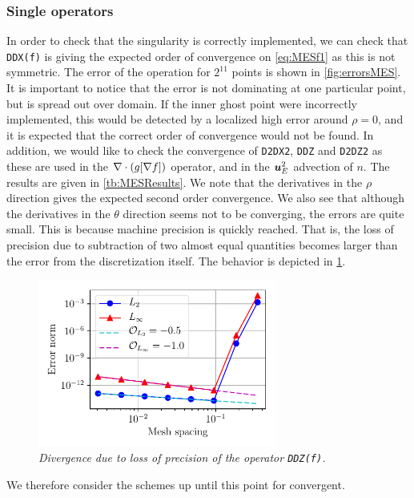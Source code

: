 \subsubsection{Single operators}
\label{sec:singleOp}
%
In order to check that the singularity is correctly implemented, we can check that \texttt{DDX(f)} is giving the expected order of convergence on \cref{eq:MESf1} as this is not symmetric.
The error of the operation for $2^{11}$ points is shown in \cref{fig:errorsMES}.
It is important to notice that the error is not dominating at one particular point, but is spread out over domain.
If the inner ghost point were incorrectly implemented, this would be detected by a localized high error around $\rho=0$, and it is expected that the correct order of convergence would not be found.
In addition, we would like to check the convergence of \texttt{D2DX2}, \texttt{DDZ} and \texttt{D2DZ2} as these are used in the $\nabla\cdot\left(g[\nabla f]\right)$ operator, and in the $\boldsymbol{u}_E^2$ advection of $n$.
The results are given in \cref{tb:MESResults}.
We note that the derivatives in the $\rho$ direction gives the expected second order convergence.
We also see that although the derivatives in the $\theta$ direction seems not to be converging, the errors are quite small.
This is because machine precision is quickly reached.
That is, the loss of precision due to subtraction of two almost equal quantities becomes larger than the error from the discretization itself.
The behavior is depicted in \cref{fig:divDDZ}.
%
\begin{figure}[htb]
    \centering
    \includegraphics[width=0.7\textwidth]{fig/divDDZ}
    \caption{\textit{
            Divergence due to loss of precision of the operator \texttt{DDZ(f)}.
        }}
    \label{fig:divDDZ}
\end{figure}
%
We therefore consider the schemes up until this point for convergent.

